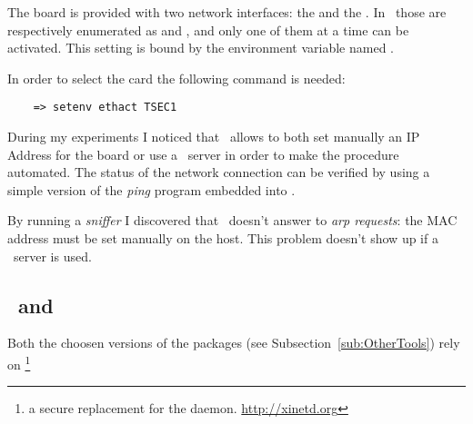     The board is provided with two network interfaces: the
     and the . In
    \uBoot\ those are respectively enumerated as  and
    , and only one of them at a time can be
    activated. This setting is bound by the environment variable
    named .

    In order to select the  card the following
    command is needed:
\begin{lstlisting}
    => setenv ethact TSEC1
\end{lstlisting}


    During my experiments I noticed that \uBoot\ allows to both set
    manually an IP Address for the board or use a \BootP\ server in order
    to make the procedure automated. The status of the network connection
    can be verified by using a simple version of the \emph{ping} program
    embedded into \uBoot.

    By running a \emph{sniffer} I discovered that \uBoot\ doesn't answer
    to \emph{arp requests}: the MAC address must be set manually on the
    host. This problem doesn't show up if a \BootP\ server is used.


\subsection{ \BootPd\ and \TFTPd } \label{sub:Xinetd}

    Both the choosen versions of the packages (see
    Subsection~\ref{sub:OtherTools}) rely on \footnote{
        a secure replacement for the  daemon.
        \url{http://xinetd.org}
    }

